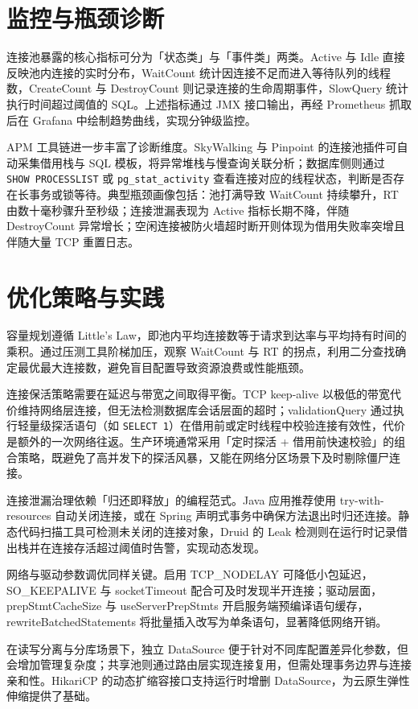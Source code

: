 \chapter{监控与瓶颈诊断}
连接池暴露的核心指标可分为「状态类」与「事件类」两类。Active 与 Idle 直接反映池内连接的实时分布，WaitCount 统计因连接不足而进入等待队列的线程数，CreateCount 与 DestroyCount 则记录连接的生命周期事件，SlowQuery 统计执行时间超过阈值的 SQL。上述指标通过 JMX 接口输出，再经 Prometheus 抓取后在 Grafana 中绘制趋势曲线，实现分钟级监控。\par
APM 工具链进一步丰富了诊断维度。SkyWalking 与 Pinpoint 的连接池插件可自动采集借用栈与 SQL 模板，将异常堆栈与慢查询关联分析；数据库侧则通过 \texttt{SHOW PROCESSLIST} 或 \texttt{pg\_{}stat\_{}activity} 查看连接对应的线程状态，判断是否存在长事务或锁等待。典型瓶颈画像包括：池打满导致 WaitCount 持续攀升，RT 由数十毫秒骤升至秒级；连接泄漏表现为 Active 指标长期不降，伴随 DestroyCount 异常增长；空闲连接被防火墙超时断开则体现为借用失败率突增且伴随大量 TCP 重置日志。\par
\chapter{优化策略与实践}
容量规划遵循 Little’s Law，即池内平均连接数等于请求到达率与平均持有时间的乘积。通过压测工具阶梯加压，观察 WaitCount 与 RT 的拐点，利用二分查找确定最优最大连接数，避免盲目配置导致资源浪费或性能瓶颈。\par
连接保活策略需要在延迟与带宽之间取得平衡。TCP keep-alive 以极低的带宽代价维持网络层连接，但无法检测数据库会话层面的超时；validationQuery 通过执行轻量级探活语句（如 \texttt{SELECT 1}）在借用前或定时线程中校验连接有效性，代价是额外的一次网络往返。生产环境通常采用「定时探活 + 借用前快速校验」的组合策略，既避免了高并发下的探活风暴，又能在网络分区场景下及时剔除僵尸连接。\par
连接泄漏治理依赖「归还即释放」的编程范式。Java 应用推荐使用 try-with-resources 自动关闭连接，或在 Spring 声明式事务中确保方法退出时归还连接。静态代码扫描工具可检测未关闭的连接对象，Druid 的 Leak 检测则在运行时记录借出栈并在连接存活超过阈值时告警，实现动态发现。\par
网络与驱动参数调优同样关键。启用 TCP\_{}NODELAY 可降低小包延迟，SO\_{}KEEPALIVE 与 socketTimeout 配合可及时发现半开连接；驱动层面，prepStmtCacheSize 与 useServerPrepStmts 开启服务端预编译语句缓存，rewriteBatchedStatements 将批量插入改写为单条语句，显著降低网络开销。\par
在读写分离与分库场景下，独立 DataSource 便于针对不同库配置差异化参数，但会增加管理复杂度；共享池则通过路由层实现连接复用，但需处理事务边界与连接亲和性。HikariCP 的动态扩缩容接口支持运行时增删 DataSource，为云原生弹性伸缩提供了基础。\par
